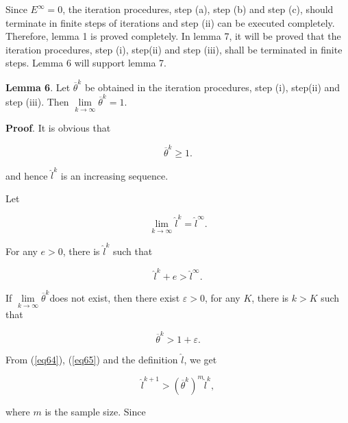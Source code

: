 \documentclass [18pt]{article}
\begin{document}
Since $E^\infty = 0$, the iteration procedures, step (a), step (b) and step
(c), should terminate in finite steps of iterations and step (ii) can be
executed completely. Therefore, lemma 1 is proved completely. In lemma 7, it
will be proved that the iteration procedures, step (i), step(ii) and step
(iii), shall be terminated in finite steps. Lemma 6 will support lemma 7$.$

\textbf{Lemma 6}. Let $\overline \theta ^k$ be obtained in the iteration
procedures, step (i), step(ii) and step (iii). Then $\mathop {\lim
}\limits_{k \to \infty } \overline \theta ^k = 1$.

\textbf{Proof}. It is obvious that


\begin{equation}
\label{eq124}
\overline \theta ^k \ge 1.
\end{equation}



\noindent
and hence $\widehat{l}^k$ is an increasing sequence.

Let


\begin{equation}
\label{eq125}
\mathop {\lim }\limits_{k \to \infty } \widehat{l}^k = \widehat{l}^\infty .
\end{equation}



For any $e > 0$, there is $\widehat{l}^k$ such that


\begin{equation}
\label{eq126}
\widehat{l}^k + e > \widehat{l}^\infty .
\end{equation}



If $\mathop {\lim }\limits_{k \to \infty } \overline \theta ^k$does not
exist, then there exist $\varepsilon > 0$, for any $K$, there is $k > K$
such that


\begin{equation}
\label{eq127}
\overline \theta ^k > 1 + \varepsilon .
\end{equation}



From (\ref{eq64}), (\ref{eq65}) and the definition $\widehat{l}$, we get


\begin{equation}
\label{eq128}
\widehat{l}^{k + 1} > (\overline \theta ^k)^m\widehat{l}^k,
\end{equation}



\noindent
where $m$ is the sample size. Since
\end{document}
